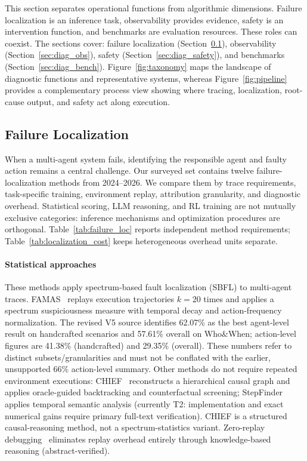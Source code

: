 This section separates operational functions from algorithmic dimensions. Failure localization is an inference task, observability provides evidence, safety is an intervention function, and benchmarks are evaluation resources. These roles can coexist. The sections cover: failure localization (Section~\ref{sec:diag_fl}), observability (Section~\ref{sec:diag_obs}), safety (Section~\ref{sec:diag_safety}), and benchmarks (Section~\ref{sec:diag_bench}). Figure~\ref{fig:taxonomy} maps the landscape of diagnostic functions and representative systems, whereas Figure~\ref{fig:pipeline} provides a complementary process view showing where tracing, localization, root-cause output, and safety act along execution.



\subsection{Failure Localization}\label{sec:diag_fl}

When a multi-agent system fails, identifying the responsible agent and faulty action remains a central challenge. Our surveyed set contains twelve failure-localization methods from 2024--2026. We compare them by trace requirements, task-specific training, environment replay, attribution granularity, and diagnostic overhead. Statistical scoring, LLM reasoning, and RL training are not mutually exclusive categories: inference mechanisms and optimization procedures are orthogonal. Table~\ref{tab:failure_loc} reports independent method requirements; Table~\ref{tab:localization_cost} keeps heterogeneous overhead units separate.

\paragraph*{Statistical approaches}
These methods apply spectrum-based fault localization (SBFL) to multi-agent traces. FAMAS~\cite{famas2025} replays execution trajectories $k=20$ times and applies a spectrum suspiciousness measure with temporal decay and action-frequency normalization. The revised V5 source identifies 62.07\% as the best agent-level result on handcrafted scenarios and 57.61\% overall on Who\&When; action-level figures are 41.38\% (handcrafted) and 29.35\% (overall). These numbers refer to distinct subsets/granularities and must not be conflated with the earlier, unsupported 66\% action-level summary. Other methods do not require repeated environment executions: CHIEF~\cite{flatlogs2026} reconstructs a hierarchical causal graph and applies oracle-guided backtracking and counterfactual screening; StepFinder~\cite{stepfinder2026} applies temporal semantic analysis (currently T2: implementation and exact numerical gains require primary full-text verification). CHIEF is a structured causal-reasoning method, not a spectrum-statistics variant. Zero-replay debugging~\cite{zeroreplay2026} eliminates replay overhead entirely through knowledge-based reasoning (abstract-verified).

